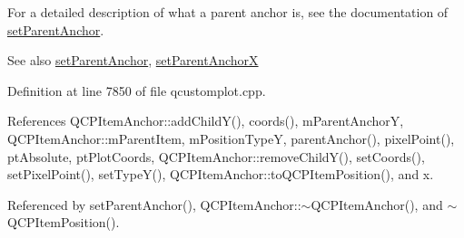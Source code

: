For a detailed description of what a parent anchor is, see the documentation of \hyperlink{class_q_c_p_item_position_ac094d67a95d2dceafa0d50b9db3a7e51}{set\+Parent\+Anchor}.

\begin{DoxySeeAlso}{See also}
\hyperlink{class_q_c_p_item_position_ac094d67a95d2dceafa0d50b9db3a7e51}{set\+Parent\+Anchor}, \hyperlink{class_q_c_p_item_position_add71461a973927c74e42179480916d9c}{set\+Parent\+Anchor\+X} 
\end{DoxySeeAlso}


Definition at line 7850 of file qcustomplot.\+cpp.



References Q\+C\+P\+Item\+Anchor\+::add\+Child\+Y(), coords(), m\+Parent\+Anchor\+Y, Q\+C\+P\+Item\+Anchor\+::m\+Parent\+Item, m\+Position\+Type\+Y, parent\+Anchor(), pixel\+Point(), pt\+Absolute, pt\+Plot\+Coords, Q\+C\+P\+Item\+Anchor\+::remove\+Child\+Y(), set\+Coords(), set\+Pixel\+Point(), set\+Type\+Y(), Q\+C\+P\+Item\+Anchor\+::to\+Q\+C\+P\+Item\+Position(), and x.



Referenced by set\+Parent\+Anchor(), Q\+C\+P\+Item\+Anchor\+::$\sim$\+Q\+C\+P\+Item\+Anchor(), and $\sim$\+Q\+C\+P\+Item\+Position().



